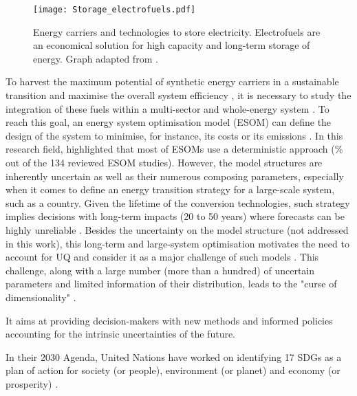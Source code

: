 \begin{figure}[htbp!]
\centering
\texttt{[image: Storage\_electrofuels.pdf]}
\caption{Energy carriers and technologies to store electricity. Electrofuels are an economical solution for high capacity and long-term storage of energy. Graph adapted from \cite{ISPT2017}.}
\label{fig:intro:Storage_electrofuels}
\end{figure}

To harvest the maximum potential of synthetic energy carriers in a sustainable transition and maximise the overall system efficiency \cite{mathiesen2015}, it is necessary to study the integration of these fuels within a multi-sector and whole-energy system \cite{Contino2020}. To reach this goal, an energy system optimisation model (ESOM) can define the design of the system to minimise, for instance, its costs or its emissions \cite{zeng2011review}. In this research field, \citet{yue2018review} highlighted that most of ESOMs use a deterministic approach (\% out of the 134 reviewed ESOM studies). However, the model structures are inherently uncertain as well as their numerous composing parameters, especially when it comes to define an energy transition strategy for a large-scale system, such as a country. Given the lifetime of the conversion technologies, such strategy implies decisions with long-term impacts (20 to 50 years) where forecasts can be highly unreliable \cite{Moret2017}. Besides the uncertainty on the model structure (not addressed in this work), this long-term and large-system optimisation motivates the need to account for \gls{UQ} and consider it as a major challenge of such models \cite{pfenninger2014energy}. This challenge, along with a large number (\ie more than a hundred) of uncertain parameters and limited information of their distribution, leads to the "curse of dimensionality" \cite{kuo2005lifting}.


It aims at providing decision-makers with new methods and informed policies accounting for the intrinsic uncertainties of the future. 




In their 2030 Agenda, United Nations have worked on identifying 17 \gls{SDGs} as a plan of action for society (or people), environment (or planet) and economy (or prosperity) \cite{un_sdgs}. 
%
%

